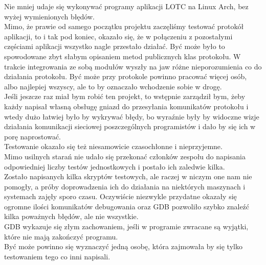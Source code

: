 \documentclass[10pt,a4paper]{article}
\begin{document}
            Nie mniej udaje się wykonywać programy aplikacji LOTC na Linux Arch, bez wyżej wymienionych błędów. \\
            Mimo, że prawie od samego początku projektu zaczęliśmy testować protokół aplikacji, to i tak pod koniec, okazało się, że w połączeniu z pozostałymi częściami aplikacji wszystko nagle przestało działać. Być może było to spowodowane zbyt słabym opisaniem metod publicznych klas protokołu. W trakcie integrowania ze sobą modułów wyszły na jaw różne nieporozumienia co do działania protokołu. Być może przy protokole powinno pracować więcej osób, albo najlepiej wszyscy, ale to by oznaczało wchodzenie sobie w drogę. \\
            Jeśli jeszcze raz miał bym robić ten projekt, to wstępnie zarządził bym, żeby każdy napisał własną obsługę gniazd do przesyłania komunikatów protokołu i wtedy dużo łatwiej było by wykrywać błędy, bo wyraźnie były by widoczne wizje działania komunikacji sieciowej poszczególnych programistów i dało by się ich w porę naprostować. \\
            Testowanie okazało się też niesamowicie czasochłonne i nieprzyjemne.\\
            Mimo usilnych starań nie udało się przekonać członków zespołu do napisania odpowiedniej liczby testów jednostkowych i postało ich zaledwie kilka.\\
            Zostało napisanych kilka skryptów testowych, ale raczej w niczym one nam nie pomogły, a próby doprowadzenia ich do działania na niektórych maszynach i systemach zajęły sporo czasu. Oczywiście niezwykle przydatne okazały się ogromne ilości komunikatów debugowania oraz GDB pozwoliło szybko znaleźć kilka poważnych błędów, ale nie wszystkie. \\
            GDB wykazuje się złym zachowaniem, jeśli w programie zwracane są wyjątki, które nie mają zakończyć programu. \\
            Być może powinno się wyznaczyć jedną osobę, która zajmowała by się tylko testowaniem tego co inni napisali. \\   
\end{document}
